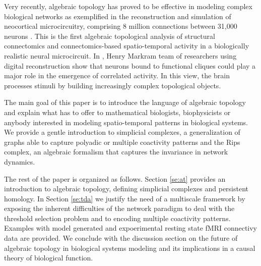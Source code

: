 \documentclass[onecollarge,runningheads]{svjour2}
\begin{document}
Very recently, algebraic topology has proved to be effective in modeling complex biological networks as exemplified in the reconstruction and simulation of neocortical microcircuitry, comprising 8 million connections between 31,000 neurons \cite{markram2015reconstruction}. This is the first algebraic topological analysis of structural connectomics and connectomics-based spatio-temporal activity in a biologically realistic neural microcircuit.  In \cite{reimann2017cliques}, Henry Markram team of researchers using digital reconstruction show that neurons bound to functional cliques could play a major role in the emergence of correlated activity. In this view, the brain processes stimuli by building increasingly complex topological objects.

The main goal of this paper is to introduce the language of algebraic topology and explain what has to offer to mathematical biologists, biophysicists or anybody interested in modeling spatio-temporal patterns in biological systems.
We provide a gentle introduction to simplicial complexes, a generalization of graphs able to capture polyadic or multiple coactivity patterns and the Rips complex, an algebraic formalism that captures the invariance in network dynamics.

The rest of the paper is organized as follows. Section \ref{se:at} provides an introduction to algebraic topology, defining simplicial complexes and persistent homology.
In Section \ref{se:tda} we justify the need of a multiscale framework by exposing the inherent difficulties of the network paradigm to deal with the threshold selection problem and to encoding multiple coactivity patterns. Examples with model generated and expoerimental resting state fMRI connectivy data are provided.
We conclude with the discussion section on the future of algebraic topology in biological systems modeling and its implications in a causal theory of biological function.

\end{document}
